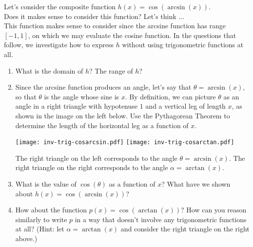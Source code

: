 \documentclass{ximera}
\begin{document}
\begin{example}

Let's consider the composite function $h(x) = \cos(\arcsin(x))$.  \\
Does it makes sense to consider this function? Let's think $\dots$ \\
This function makes sense to consider since the arcsine function has range $[-1,1]$, on which we may evaluate the cosine function. In the questions that follow, we investigate how to express $h$ without using trigonometric functions at all.%
\par
%
\begin{enumerate}

\item What is the domain of $h$?  The range of $h$?
%
\item Since the arcsine function produces an angle, let's say that $\theta = \arcsin(x)$,  so that $\theta$ is the angle whose sine is $x$.  By definition, we can picture $\theta$ as an angle in a right triangle with hypotenuse $1$ and a vertical leg of length $x$, as shown in the image on the left below.  Use the Pythagorean Theorem to determine the length of the horizontal leg as a function of $x$.
%
\begin{image}
\texttt{[image: inv-trig-cosarcsin.pdf]}
\texttt{[image: inv-trig-cosarctan.pdf]}
\end{image}%


The right triangle on the left corresponds to the angle $\theta = \arcsin(x)$.
%
The right triangle on the right corresponds to the angle $\alpha = \arctan(x)$.
%
\item What is the value of $\cos(\theta)$ as a function of $x$?  What have we shown about $h(x) = \cos(\arcsin(x))$?
%
\item How about the function $p(x) = \cos(\arctan(x))$?  How can you reason similarly to write $p$ in a way that doesn't involve any trigonometric functions at all?  (Hint:  let $\alpha = \arctan(x)$ and consider the right triangle on the right above.)%
\end{enumerate}

\end{example}
\end{document}

